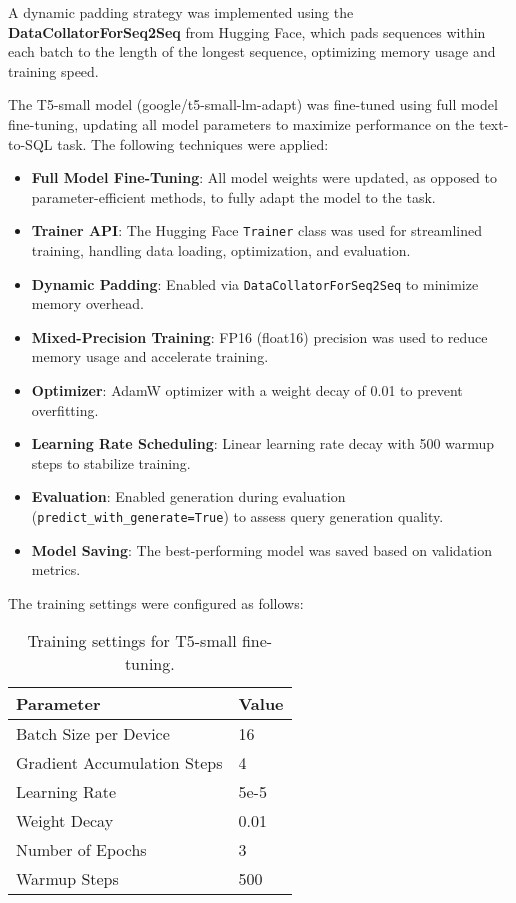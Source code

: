 \documentclass[11pt]{article}
\begin{document}
A dynamic padding strategy was implemented using the \textbf{DataCollatorForSeq2Seq} from Hugging Face, which pads sequences within each batch to the length of the longest sequence, optimizing memory usage and training speed.

The T5-small model (google/t5-small-lm-adapt) was fine-tuned using full model fine-tuning, updating all model parameters to maximize performance on the text-to-SQL task. The following techniques were applied:

\begin{itemize}
    \item \textbf{Full Model Fine-Tuning}: All model weights were updated, as opposed to parameter-efficient methods, to fully adapt the model to the task.
    \item \textbf{Trainer API}: The Hugging Face \texttt{Trainer} class was used for streamlined training, handling data loading, optimization, and evaluation.
    \item \textbf{Dynamic Padding}: Enabled via \texttt{DataCollatorForSeq2Seq} to minimize memory overhead.
    \item \textbf{Mixed-Precision Training}: FP16 (float16) precision was used to reduce memory usage and accelerate training.
    \item \textbf{Optimizer}: AdamW optimizer with a weight decay of 0.01 to prevent overfitting.
    \item \textbf{Learning Rate Scheduling}: Linear learning rate decay with 500 warmup steps to stabilize training.
    \item \textbf{Evaluation}: Enabled generation during evaluation (\texttt{predict\_with\_generate=True}) to assess query generation quality.
    \item \textbf{Model Saving}: The best-performing model was saved based on validation metrics.
\end{itemize}

The training settings were configured as follows:

\begin{table}[h]
\centering
\begin{tabular}{ll}
\toprule
\textbf{Parameter} & \textbf{Value} \\
\midrule
Batch Size per Device & 16 \\
Gradient Accumulation Steps & 4 \\
Learning Rate & 5e-5 \\
Weight Decay & 0.01 \\
Number of Epochs & 3 \\
Warmup Steps & 500 \\

\bottomrule
\end{tabular}
\caption{Training settings for T5-small fine-tuning.}
\label{tab:t5-training-settings}
\end{table}
\end{document}
